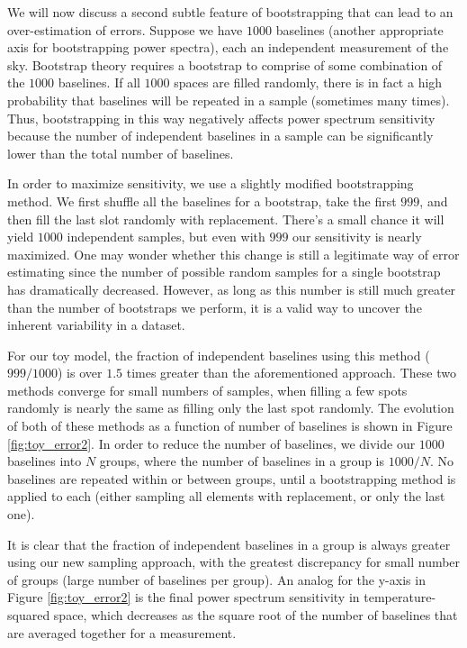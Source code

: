 \documentclass[preprint2,numberedappendix,tighten,twocolappendix]{aastex6}  %
\begin{document}
We will now discuss a second subtle feature of bootstrapping that can lead to an over-estimation of errors. Suppose we have $1000$ baselines (another appropriate axis for bootstrapping power spectra), each an independent measurement of the sky. Bootstrap theory requires a bootstrap to comprise of some combination of the $1000$ baselines. If all $1000$ spaces are filled randomly, there is in fact a high probability that baselines will be repeated in a sample (sometimes many times). Thus, bootstrapping in this way negatively affects power spectrum sensitivity because the number of independent baselines in a sample can be significantly lower than the total number of baselines.

In order to maximize sensitivity, we use a slightly modified bootstrapping method. We first shuffle all the baselines for a bootstrap, take the first $999$, and then fill the last slot randomly with replacement. There's a small chance it will yield $1000$ independent samples, but even with $999$ our sensitivity is nearly maximized. One may wonder whether this change is still a legitimate way of error estimating since the number of possible random samples for a single bootstrap has dramatically decreased. However, as long as this number is still much greater than the number of bootstraps we perform, it is a valid way to uncover the inherent variability in a dataset. 

For our toy model, the fraction of independent baselines using this method ($999/1000$) is over $1.5$ times greater than the aforementioned approach. These two methods converge for small numbers of samples, when filling a few spots randomly is nearly the same as filling only the last spot randomly. The evolution of both of these methods as a function of number of baselines is shown in Figure \ref{fig:toy_error2}. In order to reduce the number of baselines, we divide our $1000$ baselines into $N$ groups, where the number of baselines in a group is $1000/N$. No baselines are repeated within or between groups, until a bootstrapping method is applied to each (either sampling all elements with replacement, or only the last one).

It is clear that the fraction of independent baselines in a group is always greater using our new sampling approach, with the greatest discrepancy for small number of groups (large number of baselines per group). An analog for the y-axis in Figure \ref{fig:toy_error2} is the final power spectrum sensitivity in temperature-squared space, which decreases as the square root of the number of baselines that are averaged together for a measurement.
\end{document}
